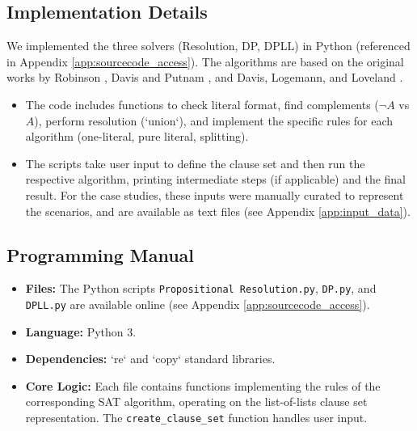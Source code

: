 \documentclass[11pt, a4paper]{article}
\begin{document}
\subsection*{Implementation Details}
We implemented the three solvers (Resolution, DP, DPLL) in Python (referenced in Appendix \ref{app:sourcecode_access}). The algorithms are based on the original works by Robinson \cite{Robinson1965}, Davis and Putnam \cite{DavisPutnam1960}, and Davis, Logemann, and Loveland \cite{DPLL1962}.
\begin{itemize}
    \item The code includes functions to check literal format, find complements ($\neg A$ vs $A$), perform resolution (`union`), and implement the specific rules for each algorithm (one-literal, pure literal, splitting).
    \item The scripts take user input to define the clause set and then run the respective algorithm, printing intermediate steps (if applicable) and the final result. For the case studies, these inputs were manually curated to represent the scenarios, and are available as text files (see Appendix \ref{app:input_data}).
\end{itemize}

\subsection*{Programming Manual}
\begin{itemize}
    \item \textbf{Files:} The Python scripts \texttt{Propositional Resolution.py}, \texttt{DP.py}, and \texttt{DPLL.py} are available online (see Appendix \ref{app:sourcecode_access}).
    \item \textbf{Language:} Python 3.
    \item \textbf{Dependencies:} `re` and `copy` standard libraries.
    \item \textbf{Core Logic:} Each file contains functions implementing the rules of the corresponding SAT algorithm, operating on the list-of-lists clause set representation. The \texttt{create\_clause\_set} function handles user input.
\end{itemize}
\end{document}
